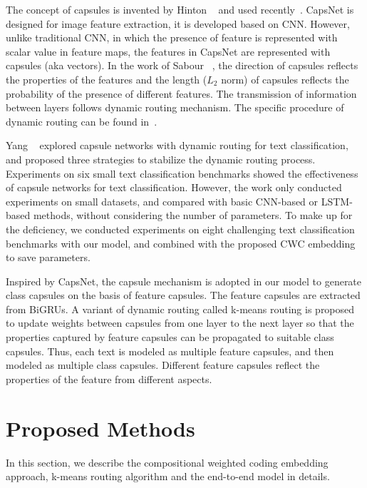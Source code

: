\documentclass[times,twocolumn,final]{elsarticle}
\begin{document}
The concept of capsules is invented by Hinton \etal~\cite{hinton2011transforming} and used recently~\cite{sabour2017dynamic, hinton2018matrix}. CapsNet is designed for image feature extraction, it is developed based on CNN. However, unlike traditional CNN, in which the presence of feature is represented with scalar value in feature maps, the features in CapsNet are represented with capsules (aka vectors). In the work of Sabour \etal~\cite{sabour2017dynamic}, the direction of capsules reflects the properties of the features and the length ($L_2$ norm) of capsules reflects the probability of the presence of different features. The transmission of information between layers follows dynamic routing mechanism. The specific procedure of dynamic routing can be found in~\cite{sabour2017dynamic}.

Yang \etal~\cite{yang2018investigating} explored capsule networks with dynamic routing for text classification, and proposed three strategies to stabilize the dynamic routing process. Experiments on six small text classification benchmarks showed the effectiveness of capsule networks for text classification. However, the work only conducted experiments on small datasets, and compared with basic CNN-based or LSTM-based methods, without considering the number of parameters. To make up for the deficiency, we conducted experiments on eight challenging text classification benchmarks with our model, and combined with the proposed CWC embedding to save parameters.

Inspired by CapsNet, the capsule mechanism is adopted in our model to generate class capsules on the basis of feature capsules. The feature capsules are extracted from BiGRUs. A variant of dynamic routing called k-means routing is proposed to update weights between capsules from one layer to the next layer so that the properties captured by feature capsules can be propagated to suitable class capsules. Thus, each text is modeled as multiple feature capsules, and then modeled as multiple class capsules. Different feature capsules reflect the properties of the feature from different aspects.

\section{Proposed Methods}

In this section, we describe the compositional weighted coding embedding approach, k-means routing algorithm and the end-to-end model in details.
\end{document}
